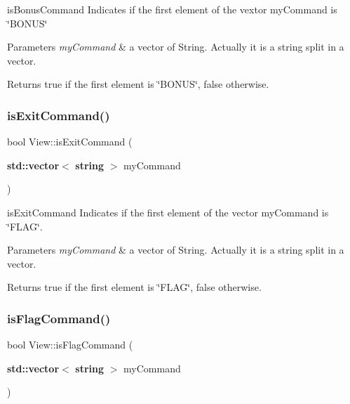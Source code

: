 is\+Bonus\+Command Indicates if the first element of the vextor my\+Command is \char`\"{}\+B\+O\+N\+U\+S\char`\"{} 


\begin{DoxyParams}{Parameters}
{\em my\+Command} & a vector of String. Actually it is a string split in a vector. \\
\hline
\end{DoxyParams}
\begin{DoxyReturn}{Returns}
true if the first element is \char`\"{}\+B\+O\+N\+U\+S\char`\"{}, false otherwise. 
\end{DoxyReturn}
\mbox{\label{class_view_ac3a7757f7c123e73569e3b9bcf89df86}} 
\subsubsection{\texorpdfstring{is\+Exit\+Command()}{isExitCommand()}}
{\footnotesize\ttfamily bool View\+::is\+Exit\+Command (\begin{DoxyParamCaption}\item[{\textbf{ std\+::vector}$<$ \textbf{ string} $>$}]{my\+Command }\end{DoxyParamCaption})}



is\+Exit\+Command Indicates if the first element of the vector my\+Command is \char`\"{}\+F\+L\+A\+G\char`\"{}. 


\begin{DoxyParams}{Parameters}
{\em my\+Command} & a vector of String. Actually it is a string split in a vector. \\
\hline
\end{DoxyParams}
\begin{DoxyReturn}{Returns}
true if the first element is \char`\"{}\+F\+L\+A\+G\char`\"{}, false otherwise. 
\end{DoxyReturn}
\mbox{\label{class_view_a26d427abb478561381207ed8d76d84c4}} 
\subsubsection{\texorpdfstring{is\+Flag\+Command()}{isFlagCommand()}}
{\footnotesize\ttfamily bool View\+::is\+Flag\+Command (\begin{DoxyParamCaption}\item[{\textbf{ std\+::vector}$<$ \textbf{ string} $>$}]{my\+Command }\end{DoxyParamCaption})}



